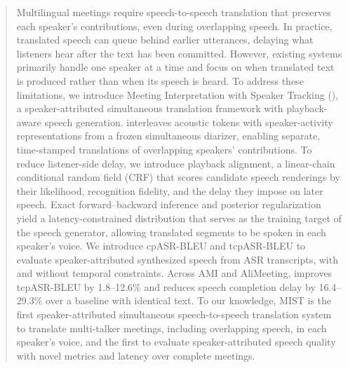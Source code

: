 \begin{abstract}

Multilingual meetings require speech-to-speech translation that preserves each speaker's contributions, even during overlapping speech. In practice, translated speech can queue behind earlier utterances, delaying what listeners hear after the text has been committed. However, existing systems primarily handle one speaker at a time and focus on when translated text is produced rather than when its speech is heard. To address these limitations, we introduce Meeting Interpretation with Speaker Tracking (\sys{}), a speaker-attributed simultaneous translation framework with playback-aware speech generation. \sys{} interleaves acoustic tokens with speaker-activity representations from a frozen simultaneous diarizer, enabling separate, time-stamped translations of overlapping speakers' contributions. To reduce listener-side delay, we introduce playback alignment, a linear-chain conditional random field (CRF) that scores candidate speech renderings by their likelihood, recognition fidelity, and the delay they impose on later speech. Exact forward--backward inference and posterior regularization yield a latency-constrained distribution that serves as the training target of the speech generator, allowing translated segments to be spoken in each speaker's voice. We introduce cpASR-BLEU and tcpASR-BLEU to evaluate speaker-attributed synthesized speech from ASR transcripts, with and without temporal constraints. Across AMI and AliMeeting, \sys{} improves tcpASR-BLEU by 1.8–12.6\% and reduces speech completion delay by 16.4–29.3\% over a baseline with identical text. To our knowledge, MIST is the first speaker-attributed simultaneous speech-to-speech translation system to translate multi-talker meetings, including overlapping speech, in each speaker's voice, and the first to evaluate speaker-attributed speech quality with novel metrics and latency over complete meetings.


\end{abstract}
